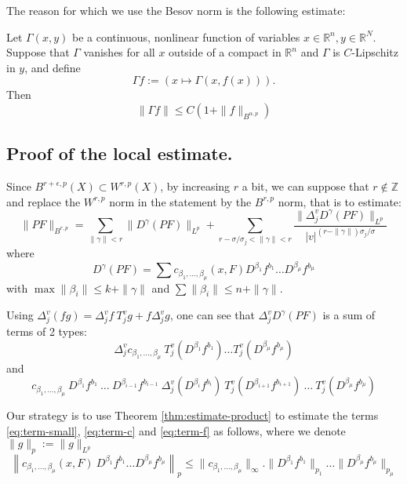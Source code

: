 The reason for which we use the Besov norm is the following estimate:
\begin{theorem}[Composition]
\label{thm:compo-besov}
Let \(\Gamma(x,y)\) be a continuous, nonlinear function of variables \(x\in
\mathbb{R}^n, y\in \mathbb{R}^N\). Suppose that \(\Gamma\) vanishes for all \(x\)
outside of a compact in \(\mathbb{R}^n\) and \(\Gamma\) is \(C\)-Lipschitz in \(y\), and define
\[
\Gamma f:= \left( x\longmapsto \Gamma(x,f(x)) \right).
\]
Then 
\[ 
\|\Gamma f\| \leq C\left( 1+ \|f\|_{B^{\alpha,p}}\right)
\]
\end{theorem}


\subsection{Proof of the local estimate.}
\label{sec:org9631d3c}
Since \(B^{r+\epsilon,p}(X)\subset W^{r,p}(X)\), by increasing \(r\) a bit, we can
suppose that \(r\not\in \mathbb{Z}\) and replace the \(W^{r,p}\) norm in the statement
by the \(B^{r,p}\) norm, that is to estimate:
\[
 \|PF\|_{B^{r,p}} = \sum_{\|\gamma\| < r} \| D^\gamma(PF)\|_{L^p} + \sum_{
r-\sigma/\sigma_j< \|\gamma\| < r} \frac{\| \Delta^v_j D^\gamma (PF)\|_{L^p}}{|v|^{(r-\|\gamma\|)\sigma_j/\sigma}}
\]
where 
\begin{equation}
\label{eq:term-small}
 D^\gamma (PF) = \sum c_{\beta_1,\dots,\beta_\mu}(x,F) D^{\beta_1} f^{b_1}\dots D^{\beta_\mu}f^{b_\mu}
\end{equation}
with \(\max \|\beta_i\| \leq k +\|\gamma\|\) and \(\sum \|\beta_i\|\leq n + \|\gamma\|\).

Using \(\Delta^v_j (fg) = \Delta^v_j f\ T^v_j g + f \Delta^v_j g\), one can see that \(\Delta^v_j D^\gamma (PF)\) is a sum of terms of 2 types:
\begin{equation}
\label{eq:term-c}
\Delta^v_j c_{\beta_1,\dots,\beta_\mu}\ T^v_j(D^{\beta_1}f^{b_1})\dots T^v_j (D^{\beta_\mu}
f^{b_\mu})
\end{equation}
and
\begin{equation}
\label{eq:term-f}
 c_{\beta_1,\dots,\beta_\mu}\ D^{\beta_1}f^{b_1}\ \dots \ D^{\beta_{i-1}}f^{b_{i-1}}\ \Delta^v_j
(D^{\beta_i} f^{b_i})\ T^v_j(D^{\beta_{i+1}} f^{b_{i+1}})\ \dots\ T^v_j(D^{\beta_\mu} f^{b_\mu})
\end{equation}

Our strategy is to use Theorem \ref{thm:estimate-product} to estimate the terms
\eqref{eq:term-small}, \eqref{eq:term-c} and \eqref{eq:term-f} as follows, where we denote \(\|g\|_p:= \|g\|_{L^p}\)
\begin{equation}
\label{eq:est-term-small}
\left\| c_{\beta_1,\dots,\beta_\mu}(x,F)\ D^{\beta_1} f^{b_1}\dots D^{\beta_\mu}f^{b_\mu} \right\|_{p} \leq \|c_{\beta_1,\dots,\beta_\mu} \|_{\infty}.\|D^{\beta_1} f^{b_1}\|_{p_1}\dots \|D^{\beta_\mu} f^{b_\mu}\|_{p_\mu}
\end{equation}

